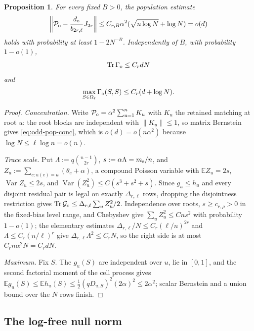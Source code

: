 \documentclass[11pt]{article}
\newtheorem{proposition}[proposition]{Proposition}
\theoremstyle{definition}
\theoremstyle{remark}
\newcommand{\E}{\mathbb E}
\newcommand{\1}{\mathbf 1}
\newcommand{\cG}{\mathcal G}
\newcommand{\cP}{\mathcal P}
\DeclareMathOperator{\Tr}{Tr}
\DeclareMathOperator{\Var}{Var}
\numberwithin{equation}{section}
\begin{document}
\begin{proposition}
\label{prop:odd-population}
For every fixed $B>0$, the population estimate
\begin{equation}\label{eq:odd-pop-conc}
 \left\|\cP_{\rm o}-\frac{d_\circ}{b_{2r,\ell}}J_{2r}\right\|
 \le C_{r,B}\alpha^2(\sqrt{n\log N}+\log N)=o(d)
\end{equation}
holds with probability at least $1-2N^{-B}$.  Independently of $B$,
with probability $1-o(1)$,
\begin{equation}\label{eq:odd-raw-trace}
 \Tr\Gamma_{\rm o}\le C_rdN
\end{equation}
and
\begin{equation}\label{eq:odd-max-diagonal}
 \max_{S\in\Omega_\ell}\Gamma_{\rm o}(S,S)\le C_r(d+\log N).
\end{equation}
\end{proposition}
\begin{proof}
\emph{Concentration.}  Write $\cP_{\rm o}=\alpha^2\sum_{u=1}^nK_u$
with $K_u$ the retained matching at root $u$: the root blocks are
independent with $\|K_u\|\le1$, so matrix Bernstein~\cite{Tropp} gives
\cref{eq:odd-pop-conc}, which is $o(d)=o(n\alpha^2)$ because
$\log N\le\ell\log n=o(n)$.

\emph{Trace scale.}  Put $\Lambda:=q\binom{n-1}{2r}$,
$s:=\alpha\Lambda=m_{\rm s}/n$, and
$Z_u:=\sum_{e:u(e)=u}(\theta_e+\alpha)$, a compound Poisson variable
with $\E Z_u=2s$, $\Var Z_u\le2s$, and
$\Var(Z_u^2)\le C(s^3+s^2+s)$.  Since $g_u\le h_u$ and every disjoint
residual pair is legal on exactly $\Delta_{r,\ell}$ rows, dropping the
disjointness restriction gives
$\Tr\cG_{\rm o}\le\Delta_{r,\ell}\sum_uZ_u^2/2$.  Independence over
roots, $s\ge c_{r,\rho}>0$ in the fixed-bias level range, and Chebyshev
give $\sum_uZ_u^2\le Cns^2$ with probability $1-o(1)$; the elementary
estimates $\Delta_{r,\ell}/N\le C_r(\ell/n)^{2r}$ and
$\Lambda\le C_r(n/\ell)^r$ give $\Delta_{r,\ell}\Lambda^2\le C_rN$, so
the right side is at most $C_rn\alpha^2N=C_rdN$.

\emph{Maximum.}  Fix $S$.  The $g_u(S)$ are independent over $u$, lie
in $[0,1]$, and the second factorial moment of the cell process gives
$\E g_u(S)\le\E h_u(S)\le\tfrac12(qD_{u,S})^2(2\alpha)^2\le2\alpha^2$;
scalar Bernstein and a union bound over the $N$ rows finish.
\end{proof}

\subsection{The log-free null norm}
\end{document}
